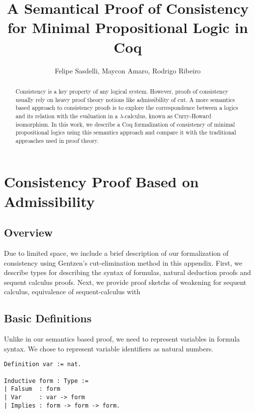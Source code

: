 \documentclass[12pt]{article}
\title{A Semantical Proof of Consistency for Minimal Propositional Logic in Coq}
\author{Felipe Sasdelli\inst{1}, Maycon Amaro\inst{1}, Rodrigo Ribeiro\inst{1}}
\theoremstyle{definition}
\begin{document}
 

\maketitle

\begin{abstract}
  Consistency is a key property of any logical system. However, proofs of
  consistency usually rely on heavy proof theory notions like admissibility
  of cut. A more semantics based approach to consistency proofs is to explore the
  correspondence between a logics and its relation with the
  evaluation in a $\lambda$-calculus, known as Curry-Howard isomorphism.
  In this work, we describe a Coq formalization of consistency of minimal
  propositional logics using this semantics approach and compare it with 
  the traditional approaches used in proof theory.
\end{abstract}






\appendix

\section{Consistency Proof Based on Admissibility}

\subsection{Overview}

Due to limited space, we include a brief description of our formalization of
consistency using Gentzen's cut-elimination method in this appendix. First, we
describe types for describing the syntax of formulas, natural deduction proofs
and sequent calculus proofs. Next, we provide proof sketchs of weakening for
sequent calculus, equivalence of sequent-calculus with

\subsection{Basic Definitions}

Unlike in our semantics based proof, we need to represent variables in
formula syntax. We chose to represent variable identifiers as natural
numbers.

\begin{lstlisting}
Definition var := nat.

Inductive form : Type :=
| Falsum  : form 
| Var     : var -> form
| Implies : form -> form -> form.
\end{lstlisting}
\end{document}
